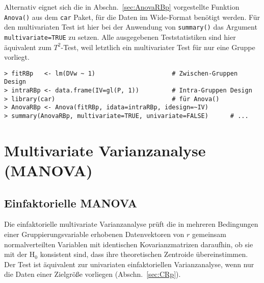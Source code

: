 Alternativ eignet sich die in Abschn.\ \ref{sec:AnovaRBp} vorgestellte Funktion \lstinline!Anova()! aus dem \lstinline!car! Paket, für die Daten im Wide-Format benötigt werden. Für den multivariaten Test ist hier bei der Anwendung von \lstinline!summary()! das Argument \lstinline!multivariate=TRUE! zu setzen. Alle ausgegebenen Teststatistiken sind hier äquivalent zum $T^{2}$-Test, weil letztlich ein multivariater Test für nur eine Gruppe vorliegt.
\begin{lstlisting}
> fitRBp   <- lm(DVw ~ 1)                     # Zwischen-Gruppen Design
> intraRBp <- data.frame(IV=gl(P, 1))         # Intra-Gruppen Design
> library(car)                                # für Anova()
> AnovaRBp <- Anova(fitRBp, idata=intraRBp, idesign=~IV)
> summary(AnovaRBp, multivariate=TRUE, univariate=FALSE)      # ...
\end{lstlisting}

\section{Multivariate Varianzanalyse (MANOVA)}
\label{sec:multManova}

\subsection{Einfaktorielle MANOVA}
\label{sec:multManova1}

Die einfaktorielle multivariate Varianzanalyse prüft die in mehreren Bedingungen einer Gruppierungsvariable erhobenen Datenvektoren von $r$ gemeinsam normalverteilten Variablen mit identischen Kovarianzmatrizen daraufhin, ob sie mit der $\text{H}_{0}$ konsistent sind, dass ihre theoretischen Zentroide übereinstimmen. Der Test ist äquivalent zur univariaten einfaktoriellen Varianzanalyse, wenn nur die Daten einer Zielgröße vorliegen (Abschn.\ \ref{sec:CRp}).


